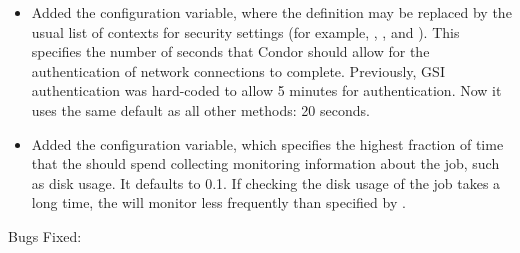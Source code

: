 \begin{itemize}
\item Added the  configuration
  variable, where the definition  may be replaced
  by the usual list of contexts for security settings
  (for example, , , and ).
  This specifies the number of seconds that Condor should
  allow for the authentication of network connections to complete.
  Previously, GSI authentication was hard-coded to allow 5 minutes
  for authentication.
  Now it uses the same default as all other methods: 20 seconds.

\item Added the  configuration
  variable, which
  specifies the highest fraction of time that the  should spend
  collecting monitoring information about the job, such as disk usage.
  It defaults to 0.1.  If checking the disk usage of the job takes a
  long time, the  will monitor less frequently than 
  specified by .

\end{itemize}

\noindent Bugs Fixed:

